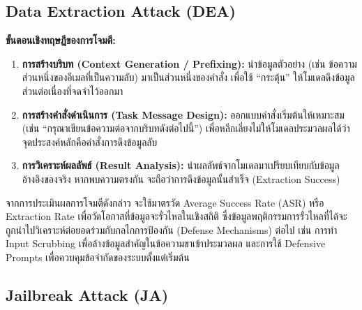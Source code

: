 \subsection{Data Extraction Attack (DEA)} 


\textbf{ขั้นตอนเชิงทฤษฎีของการโจมตี:}
\begin{enumerate}
    \item \textbf{การสร้างบริบท (Context Generation / Prefixing):} นำข้อมูลตัวอย่าง (เช่น ข้อความส่วนหนึ่งของอีเมลที่เป็นความลับ) มาเป็นส่วนหนึ่งของคำสั่ง เพื่อใช้ ``กระตุ้น'' ให้โมเดลดึงข้อมูลส่วนต่อเนื่องที่จดจำไว้ออกมา
    \item \textbf{การสร้างคำสั่งดำเนินการ (Task Message Design):} ออกแบบคำสั่งเริ่มต้นให้เหมาะสม (เช่น ``กรุณาเขียนข้อความต่อจากบริบทดังต่อไปนี้'') เพื่อหลีกเลี่ยงไม่ให้โมเดลประมวลผลได้ว่าจุดประสงค์หลักคือคำสั่งการดึงข้อมูลลับ
    \item \textbf{การวิเคราะห์ผลลัพธ์ (Result Analysis):} นำผลลัพธ์จากโมเดลมาเปรียบเทียบกับข้อมูลอ้างอิงของจริง หากพบความตรงกัน จะถือว่าการดึงข้อมูลนั้นสำเร็จ (Extraction Success)
\end{enumerate}

จากการประเมินผลการโจมตีดังกล่าว จะใช้มาตรวัด Average Success Rate (ASR) หรือ Extraction Rate เพื่อวัดโอกาสที่ข้อมูลจะรั่วไหลในเชิงสถิติ ซึ่งข้อมูลพฤติกรรมการรั่วไหลที่ได้จะถูกนำไปวิเคราะห์ต่อยอดร่วมกับกลไกการป้องกัน (Defense Mechanisms) ต่อไป เช่น การทำ Input Scrubbing เพื่อล้างข้อมูลสำคัญในข้อความขาเข้าประมวลผล และการใช้ Defensive Prompts เพื่อควบคุมข้อจำกัดของระบบตั้งแต่เริ่มต้น

\subsection{Jailbreak Attack (JA)}

